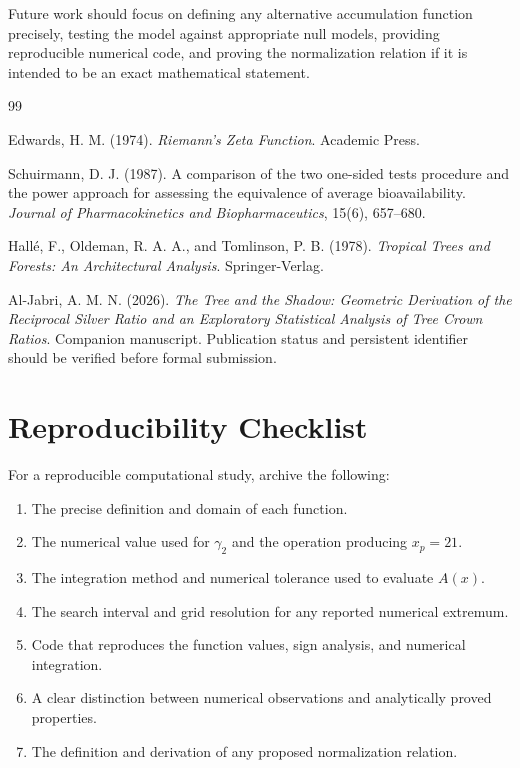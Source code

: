 \documentclass[11pt,a4paper]{article}
\begin{document}
Future work should focus on defining any alternative
accumulation function precisely, testing the model against
appropriate null models, providing reproducible numerical
code, and proving the normalization relation if it is
intended to be an exact mathematical statement.

\begin{thebibliography}{99}

Edwards, H. M. (1974).
\textit{Riemann's Zeta Function}.
Academic Press.

Schuirmann, D. J. (1987).
A comparison of the two one-sided tests procedure and the
power approach for assessing the equivalence of average
bioavailability.
\textit{Journal of Pharmacokinetics and Biopharmaceutics},
15(6), 657--680.

Hall\'e, F., Oldeman, R. A. A., and Tomlinson, P. B. (1978).
\textit{Tropical Trees and Forests: An Architectural Analysis}.
Springer-Verlag.

Al-Jabri, A. M. N. (2026).
\textit{The Tree and the Shadow: Geometric Derivation of the
Reciprocal Silver Ratio and an Exploratory Statistical Analysis
of Tree Crown Ratios}.
Companion manuscript. Publication status and persistent
identifier should be verified before formal submission.

\end{thebibliography}

\appendix

\section{Reproducibility Checklist}

For a reproducible computational study, archive the following:

\begin{enumerate}
\item The precise definition and domain of each function.
\item The numerical value used for \(\gamma_2\) and the
operation producing \(x_p=21\).
\item The integration method and numerical tolerance used
to evaluate \(A(x)\).
\item The search interval and grid resolution for any
reported numerical extremum.
\item Code that reproduces the function values, sign
analysis, and numerical integration.
\item A clear distinction between numerical observations
and analytically proved properties.
\item The definition and derivation of any proposed
normalization relation.
\end{enumerate}
\end{document}
